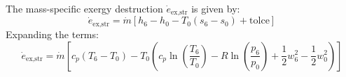 The mass-specific exergy destruction \( \dot{e}_{\text{ex,str}} \) is given by:  
\[
\dot{e}_{\text{ex,str}} = \dot{m} \left[ h_6 - h_0 - T_0 \left( s_6 - s_0 \right) + \text{tolce} \right]
\]  
Expanding the terms:  
\[
\dot{e}_{\text{ex,str}} = \dot{m} \left[ c_p \left( T_6 - T_0 \right) - T_0 \left( c_p \ln \left( \frac{T_6}{T_0} \right) - R \ln \left( \frac{p_6}{p_0} \right) + \frac{1}{2} w_6^2 - \frac{1}{2} w_0^2 \right) \right]
\]